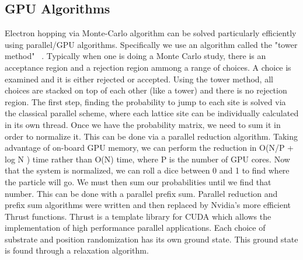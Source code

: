 \subsection{GPU Algorithms}
Electron hopping via Monte-Carlo algorithm can be solved particularly efficiently using parallel/GPU algorithms. Specifically we use an algorithm called the "tower method" ~\cite{Krauth06}. Typically when one is doing a Monte Carlo study, there is an acceptance region and a rejection region ammong a range of choices. A choice is examined and it is either rejected or accepted. Using the tower method, all choices are stacked on top of each other (like a tower) and there is no rejection region. The first step, finding the probability to jump to each site is solved via the classical parallel scheme, where each lattice site can be individually calculated in its own thread. Once we have the probability matrix, we need to sum it in order to normalize it. This can be done via a parallel reduction algorithm. Taking advantage of on-board GPU memory, we can perform the reduction in O(N/P + log N ) time rather than O(N) time, where P is the number of GPU cores. Now that the system is normalized, we can roll a dice between 0 and 1 to find where the particle will go. We must then sum our probabilities until we find that number. This can be done with a parallel prefix sum. Parallel reduction and prefix sum algorithms were written and then replaced by Nvidia's more efficient Thrust functions. Thrust is a template library for CUDA which allows the implementation of high performance parallel applications. Each choice of substrate and position randomization has its own ground state. This ground state is found through a relaxation algorithm.




